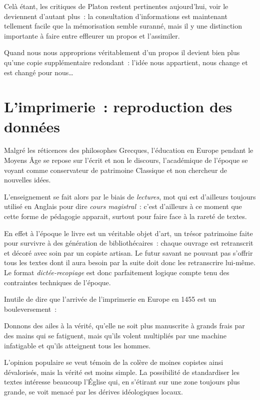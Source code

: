 Celà étant, les critiques de Platon restent pertinentes aujourd'hui, voir le deviennent d'autant plus~: la consultation d'informations est maintenant tellement facile que la mémorisation semble suranné, mais il y une distinction importante à faire entre effleurer un propos et l'assimiler.

Quand nous nous approprions véritablement d'un propos il devient bien plus qu'une copie supplémentaire redondant~: l'idée nous appartient, nous change et est changé pour nous\ldots

\chapter{L'imprimerie~: reproduction des données}

Malgré les réticences des philosophes Grecques, l'éducation en Europe pendant le Moyens Âge se repose sur l'écrit et non le discours, l'académique de l'époque se voyant comme conservateur de patrimoine Classique et non chercheur de nouvelles idées\cite{friesen-the-lecture}.

L'enseignement se fait alors par le biais de \emph{lectures}, mot qui est d'ailleurs toujours utilisé en Anglais pour dire \emph{cours magistral}~: c'est d’ailleurs à ce moment que cette forme de pédagogie apparait, surtout pour faire face à la rareté de textes.

En effet à l'époque le livre est un véritable objet d'art, un trésor patrimoine faite pour survivre à des génération de bibliothécaires~: chaque ouvrage est retranscrit et décoré avec soin par un copiste artisan. Le futur savant ne pouvant pas s'offrir tous les textes dont il aura besoin par la suite doit donc les retranscrire lui-même\cite{friesen-the-lecture}. Le format \emph{dictée-recopiage} est donc parfaitement logique compte tenu des contraintes techniques de l'époque. 

Inutile de dire que l'arrivée de l'imprimerie en Europe en 1455\cite{walsham2003} est un bouleversement~:

\begin{coolquote}
Donnons des ailes à la vérité, qu'elle ne soit plus manuscrite à grands frais par des mains qui se fatiguent, mais qu'ils volent multipliés par une machine infatigable et qu'ils atteignent tous les hommes.
\end{coolquote}

L'opinion populaire se veut témoin de la colère de moines copistes ainsi dévalorisés, mais la vérité est moins simple. La possibilité de standardiser les textes intéresse beaucoup l'Église qui, en s'étirant sur une zone toujours plus grande, se voit menacé par les dérives idéologiques locaux.

